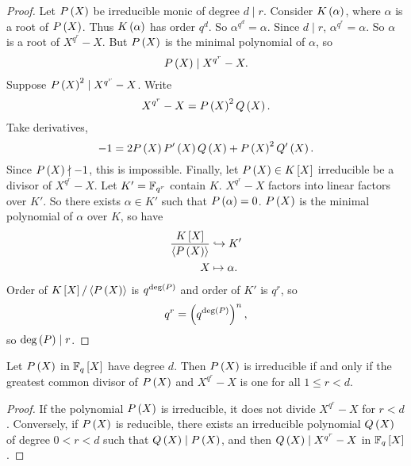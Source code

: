 \begin{proof}
Let $ P\left( X \right) $ be irreducible monic of degree $ d \mid r $. Consider $ K\left( \alpha \right) $, where $ \alpha $ is a root of $ P\left( X \right) $. Thus $ K\left( \alpha \right) $ has order $ q^d $. So $ \alpha^{q^d} = \alpha $. Since $ d \mid r $, $ \alpha^{q^r} = \alpha $. So $ \alpha $ is a root of $ X^{q^r} - X $. But $ P\left( X \right) $ is the minimal polynomial of $ \alpha $, so
$$ P\left( X \right) \mid X^{q^r} - X. $$
Suppose $ P\left( X \right)^2 \mid X^{q^r} - X $. Write
$$ X^{q^r} - X = P\left( X \right)^2Q\left( X \right). $$
Take derivatives,
$$ -1 = 2P\left( X \right)P'\left( X \right)Q\left( X \right) + P\left( X \right)^2Q'\left( X \right). $$
Since $ P\left( X \right) \nmid -1 $, this is impossible. Finally, let $ P\left( X \right) \in K\left[ X \right] $ irreducible be a divisor of $ X^{q^r} - X $. Let $ K' = \mathbb{F}_{q^r} $ contain $ K $. $ X^{q^r} - X $ factors into linear factors over $ K' $. So there exists $ \alpha \in K' $ such that $ P\left( \alpha \right) = 0 $. $ P\left( X \right) $ is the minimal polynomial of $ \alpha $ over $ K $, so have
\begin{align*}
\dfrac{K\left[ X \right]}{\left\langle P\left( X \right) \right\rangle} & \hookrightarrow K' \\
X & \mapsto \alpha.
\end{align*}
Order of $ K\left[ X \right] / \left\langle P\left( X \right) \right\rangle $ is $ q^{\deg\left( P \right)} $ and order of $ K' $ is $ q^r $, so
$$ q^r = \left( q^{\deg\left( P \right)} \right)^n, $$
so $ \deg\left( P \right) \mid r $.
\end{proof}

\begin{corollary}
Let $ P\left( X \right) $ in $ \mathbb{F}_q\left[ X \right] $ have degree $ d $. Then $ P\left( X \right) $ is irreducible if and only if the greatest common divisor of $ P\left( X \right) $ and $ X^{q^r} - X $ is one for all $ 1 \le r < d $.
\end{corollary}

\begin{proof}
If the polynomial $ P\left( X \right) $ is irreducible, it does not divide $ X^{q^r} - X $ for $ r < d $. Conversely, if $ P\left( X \right) $ is reducible, there exists an irreducible polynomial $ Q\left( X \right) $ of degree $ 0 < r < d $ such that $ Q\left( X \right) \mid P\left( X \right) $, and then $ Q\left( X \right) \mid X^{q^r} - X $ in $ \mathbb{F}_q\left[ X \right] $.
\end{proof}

